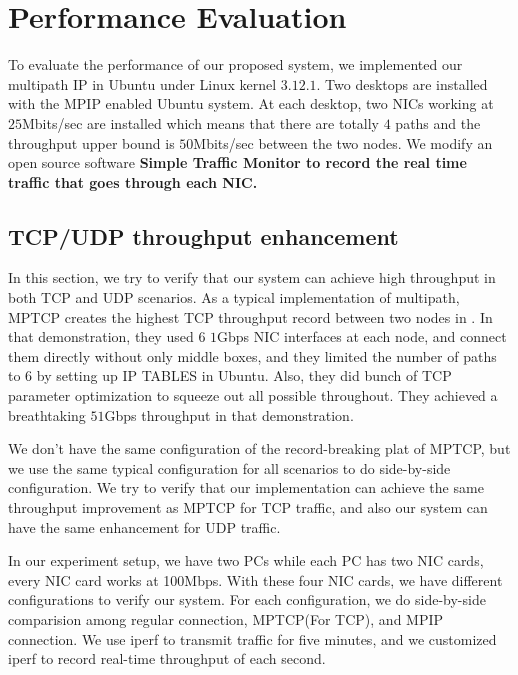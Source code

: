 \section{Performance Evaluation}
\label{sec:evaluation}
To evaluate the performance of our proposed system, we implemented our multipath IP in Ubuntu under Linux kernel $3.12.1$. Two desktops are installed with the MPIP enabled Ubuntu system. At each desktop, two NICs working at $25$Mbits/sec are installed which means that there are totally $4$ paths and the throughput upper bound is $50$Mbits/sec between the two nodes. We modify an open source software \bf{Simple Traffic Monitor}\cite{simon01} to record the real time traffic that goes through each NIC.


\subsection{TCP/UDP throughput enhancement}
\label{sec:tcp}

In this section, we try to verify that our system can achieve high throughput in both TCP and UDP scenarios. As a typical implementation of multipath, MPTCP creates the highest TCP throughput record between two nodes in \cite{record}. In that demonstration, they used $6$ $1$Gbps NIC interfaces at each node, and connect them directly without only middle boxes, and they limited the number of paths to $6$ by setting up IP TABLES in Ubuntu. Also, they did bunch of TCP parameter optimization to squeeze out all possible throughout. They achieved a breathtaking $51$Gbps throughput in that demonstration. 

We don't have the same configuration of the record-breaking plat of MPTCP, but we use the same typical configuration for all scenarios to do side-by-side configuration. We try to verify that our implementation can achieve the same throughput improvement as MPTCP for TCP traffic, and also our system can have the same enhancement for UDP traffic. 

In our experiment setup, we have two PCs while each PC has two NIC cards, every NIC card works at 100Mbps. With these four NIC cards, we have different configurations to verify our system. For each configuration, we do side-by-side comparision among regular connection, MPTCP(For TCP), and MPIP connection. We use iperf to transmit traffic for five minutes, and we customized iperf to record real-time throughput of each second.

